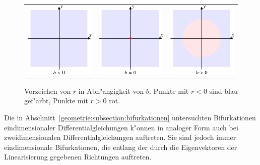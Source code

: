 \begin{figure}
\centering
\begin{tabular}{ccc}
\includegraphics{chapters/images/hopf-4.pdf}&%
\includegraphics{chapters/images/hopf-5.pdf}&%
\includegraphics{chapters/images/hopf-6.pdf}%
\end{tabular}
\caption{Vorzeichen von $\dot r$ in Abh"angigkeit von $b$.
Punkte mit $\dot r <0$ sind blau gef"arbt, Punkte mit $\dot r >0$ rot.
\label{geometrie:hopfvorzeichen}}
\end{figure}%
Die in Abschnitt~\ref{geometrie:subsection:bifurkationen} untersuchten
Bifurkationen eindimensionaler Differentialgleichungen k"onnen in
analoger Form auch bei zweidimensionalen Differentialgleichungen auftreten.
Sie sind jedoch immer eindimensionale Bifurkationen, die entlang der
durch die Eigenvektoren der Linearisierung gegebenen Richtungen
auftreten.

